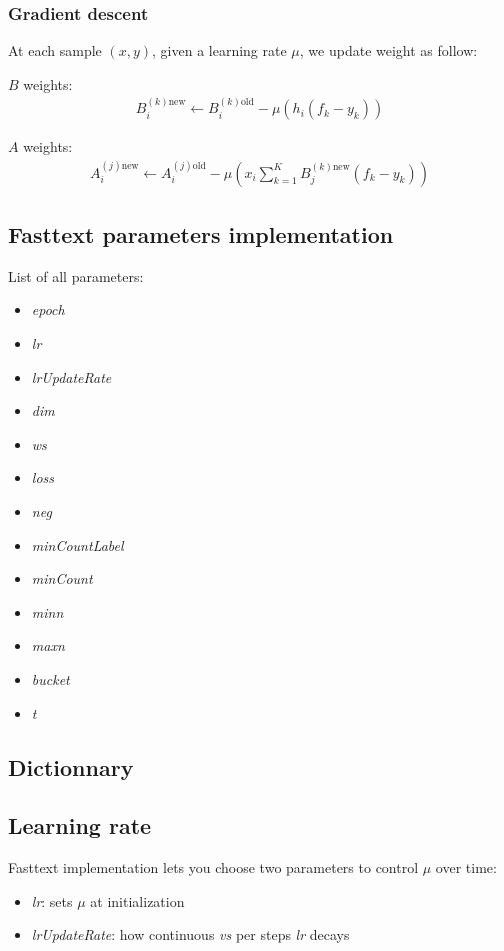 \subsubsection*{Gradient descent}

At each sample $(x, y)$, given a learning rate $\mu$, we update weight as follow:

$B$ weights:
\begin{align}
	B_i^{(k)\mbox{new}} \leftarrow B_i^{(k)\mbox{old}} - \mu (h_i (f_k - y_k))
\end{align}

$A$ weights:
\begin{align}
	A_i^{(j)\mbox{new}} \leftarrow A_i^{(j)\mbox{old}} - 
	\mu 
	\left(
		x_i \sum_{k=1}^K B_j^{(k)\mbox{new}} (f_k - y_k) 
	\right)
\end{align}

\subsection{Fasttext parameters implementation}

List of all parameters:
\begin{itemize}
	\item \textit{epoch}
	\item \textit{lr}
	\item \textit{lrUpdateRate}
	\item \textit{dim}
	\item \textit{ws}
	\item \textit{loss}
	\item \textit{neg}
	\item \textit{minCountLabel}
	\item \textit{minCount}
	\item \textit{minn}
	\item \textit{maxn}
	\item \textit{bucket}
	\item \textit{t}
\end{itemize}

\subsection*{Dictionnary}

\subsection*{Learning rate}

Fasttext implementation lets you choose two parameters to control $\mu$ over time:
\begin{itemize}
	\item \textit{lr}: sets $\mu$ at initialization
	\item \textit{lrUpdateRate}: how continuous \textit{vs} per steps \textit{lr} decays
\end{itemize}

